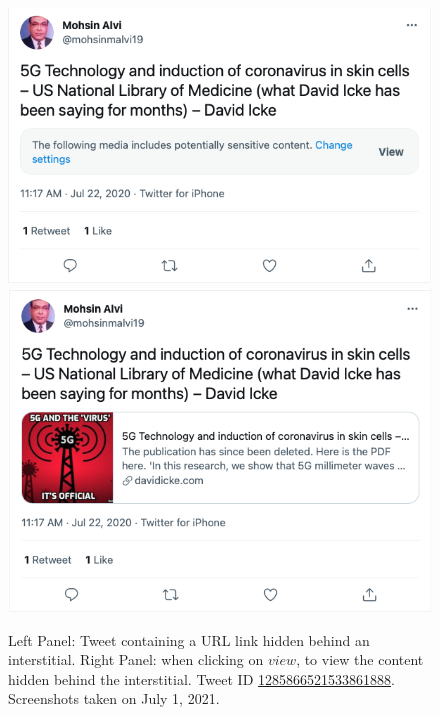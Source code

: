 \documentclass{article}
\begin{document}
\begin{figure}[h]
	\centering
		\includegraphics[scale=0.35]{./img/tweets/Capture_2021-07-01_2.png} 
		\includegraphics[scale=0.35]{./img/tweets/Capture_2021-07-01.png}
	\caption{Left Panel: Tweet containing a URL link hidden behind an interstitial. Right Panel: when clicking on $view$, to view the content hidden behind the interstitial. Tweet ID \href{https://twitter.com/mohsinmalvi19/status/1285866521533861888}{1285866521533861888}. Screenshots taken on July 1, 2021. }
	\label{fig_notice}
\end{figure}
\end{document}
